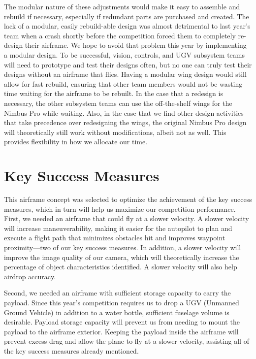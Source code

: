 \documentclass[]{auvsi_doc}
\begin{document}
The modular nature of these adjustments would make it easy to assemble and rebuild if necessary, especially if redundant parts are purchased and created. The lack of a modular, easily rebuild-able design was almost detrimental to last year's team when a crash shortly before the competition forced them to completely re-design their airframe. We hope to avoid that problem this year by implementing a modular design. To be successful, vision, controls, and UGV subsystem teams will need to prototype and test their designs often, but no one can truly test their designs without an airframe that flies. Having a modular wing design would still allow for fast rebuild, ensuring that other team members would not be wasting time waiting for the airframe to be rebuilt. In the case that a redesign is necessary, the other subsystem teams can use the off-the-shelf wings for the Nimbus Pro while waiting. Also, in the case that we find other design activities that take precedence over redesigning the wings, the original Nimbus Pro design will theoretically still work without modifications, albeit not as well. This provides flexibility in how we allocate our time.

\section{Key Success Measures}

This airframe concept was selected to optimize the achievement of the key success measures, which in turn will help us maximize our competition performance. First, we needed an airframe that could fly at a slower velocity. A slower velocity will increase maneuverability, making it easier for the autopilot to plan and execute a flight path that minimizes obstacles hit and improves waypoint proximity---two of our key success measures. In addition, a slower velocity will improve the image quality of our camera, which will theoretically increase the percentage of object characteristics identified. A slower velocity will also help airdrop accuracy.

Second, we needed an airframe with sufficient storage capacity to carry the payload. Since this year's competition requires us to drop a UGV (Unmanned Ground Vehicle) in addition to a water bottle, sufficient fuselage volume is desirable. Payload storage capacity will prevent us from needing to mount the payload to the airframe exterior. Keeping the payload inside the airframe will prevent excess drag and allow the plane to fly at a slower velocity, assisting all of the key success measures already mentioned.
\end{document}
